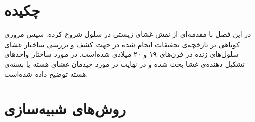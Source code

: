 \setRL
\clearpage

\def \MemSimRev {\Mempath /MembraneSimReview}

\section{
چکیده
}
در این فصل با مقدمه‌ای از نقش غشای زیستی در سلول شروع کرده. سپس مروری کوتاهی بر تارخچه‌ی تحقیقات انجام شده در جهت کشف و بررسی ساختار غشای سلول‌های زنده در قرن‌های ۱۹ و ۲۰ میلادی شده‌است. در مورد ساختار واحد‌های تشکیل دهنده‌ی غشا بحث شده و در نهایت در مورد چیدمان غشای هسته یا بسته‌ی هسته توضیح داده شده‌است.

\section{
روش‌های شبیه‌سازی
}

